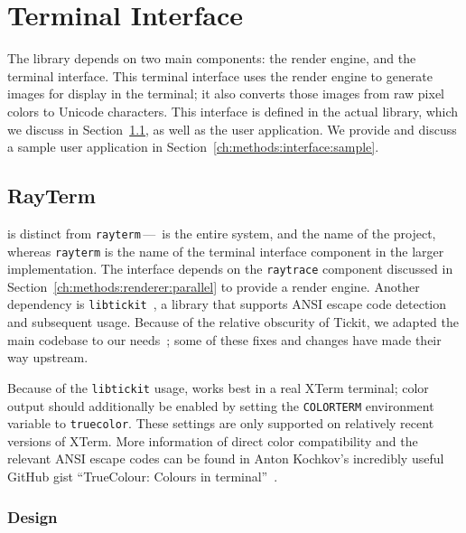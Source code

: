 \section{Terminal Interface}
\label{ch:methods:interface}

The \name{} library depends on two main components: the render engine, and the terminal interface.
This terminal interface uses the render engine to generate images for display in the terminal; it also converts those images from raw pixel colors to Unicode characters.
This interface is defined in the actual library, which we discuss in Section~\ref{ch:methods:interface:rayterm}, as well as the user application.
We provide and discuss a sample user application in Section~\ref{ch:methods:interface:sample}.

\subsection{RayTerm}
\label{ch:methods:interface:rayterm}

 \name{} is distinct from \texttt{rayterm}\,---\,\name{} is the entire system, and the name of the project, whereas \texttt{rayterm} is the name of the terminal interface component in the larger implementation.
The interface depends on the \texttt{raytrace} component discussed in Section~\ref{ch:methods:renderer:parallel} to provide a render engine.
Another dependency is \texttt{libtickit}~\cite{libtickitLibrary}, a library that supports ANSI escape code detection and subsequent usage.
Because of the relative obscurity of Tickit, we adapted the main codebase to our needs~\cite{libtickitCustom}; some of these fixes and changes have made their way upstream.

Because of the \texttt{libtickit} usage, \name{} works best in a real XTerm terminal; color output should additionally be enabled by setting the \texttt{COLORTERM} environment variable to \texttt{truecolor}.
These settings are only supported on relatively recent versions of XTerm.
More information of direct color compatibility and the relevant ANSI escape codes can be found in Anton Kochkov's incredibly useful GitHub gist ``TrueColour: Colours in terminal''~\cite{kochkov2019colours}.

\subsubsection{Design}
\label{ch:methods:interface:tickit:design}

